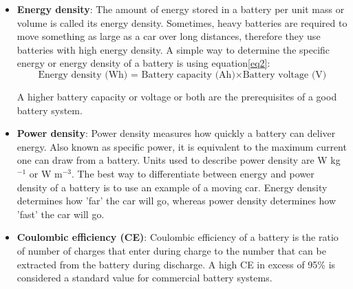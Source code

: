 \begin{itemize}
\item \textbf{Energy density}: The amount of energy stored in a battery per unit mass or volume is called its energy density. Sometimes, heavy batteries are required to move something as large as a car over long distances, therefore they use batteries with high energy density. A simple way to determine the specific energy or energy density of a battery is using equation\ref{eq2}:
\begin{equation} \label{eq2}
    \text{Energy density (Wh) = } \text{Battery capacity (Ah)} \times \text{Battery voltage (V)}
\end{equation}

A higher battery capacity or voltage or both are the prerequisites of a good battery system. 

\item \textbf{Power density}: Power density measures how quickly a battery can deliver energy. Also known as specific power, it is equivalent to the maximum current one can draw from a battery. Units used to describe power density are W kg$^{-1}$ or W m$^{-3}$. The best way to differentiate between energy and power density of a battery is to use an example of a moving car. Energy density determines how 'far' the car will go, whereas power density determines how 'fast' the car will go.

\item \textbf{Coulombic efficiency (CE)}: Coulombic efficiency of a battery is the ratio of number of charges that enter during charge to the number that can be extracted from the battery during discharge. A high CE in excess of 95\% is considered a standard value for commercial battery systems. 
\end{itemize}

